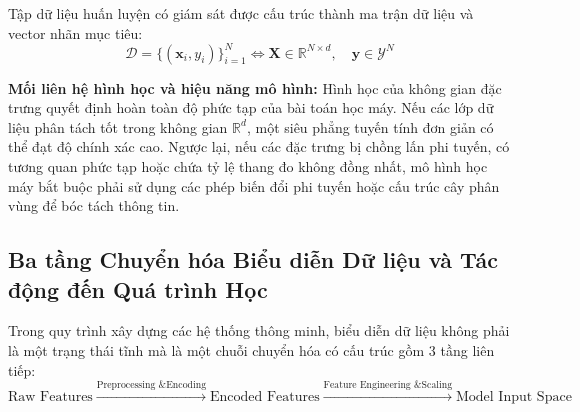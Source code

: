 \documentclass[12pt,a4paper]{report}
\begin{document}
Tập dữ liệu huấn luyện có giám sát được cấu trúc thành ma trận dữ liệu và vector nhãn mục tiêu:
\begin{equation}
\mathcal{D} = \{(\mathbf{x}_i, y_i)\}_{i=1}^N \iff \mathbf{X} \in \mathbb{R}^{N \times d}, \quad \mathbf{y} \in \mathcal{Y}^N
\end{equation}

\textbf{Mối liên hệ hình học và hiệu năng mô hình:} Hình học của không gian đặc trưng quyết định hoàn toàn độ phức tạp của bài toán học máy. Nếu các lớp dữ liệu phân tách tốt trong không gian $\mathbb{R}^d$, một siêu phẳng tuyến tính đơn giản có thể đạt độ chính xác cao. Ngược lại, nếu các đặc trưng bị chồng lấn phi tuyến, có tương quan phức tạp hoặc chứa tỷ lệ thang đo không đồng nhất, mô hình học máy bắt buộc phải sử dụng các phép biến đổi phi tuyến hoặc cấu trúc cây phân vùng để bóc tách thông tin.

\subsection{Ba tầng Chuyển hóa Biểu diễn Dữ liệu và Tác động đến Quá trình Học}
Trong quy trình xây dựng các hệ thống thông minh, biểu diễn dữ liệu không phải là một trạng thái tĩnh mà là một chuỗi chuyển hóa có cấu trúc gồm 3 tầng liên tiếp:
\begin{equation}
\text{Raw Features} \xrightarrow{\text{Preprocessing \& Encoding}} \text{Encoded Features} \xrightarrow{\text{Feature Engineering \& Scaling}} \text{Model Input Space}
\end{equation}
\end{document}
